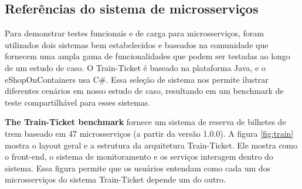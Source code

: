 

\subsection{Referências do sistema de microsserviços}
\label{subsec:benchmark}

Para demonstrar testes funcionais e de carga para microsserviços, foram utilizados dois sistemas bem estabelecidos e baseados na comunidade que fornecem uma ampla gama de funcionalidades que podem ser testadas ao longo de um estudo de caso. O Train-Ticket \cite{trainticket} é baseado na plataforma Java, e o eShopOnContainers \cite{eshop} usa C\#. Essa seleção de sistema nos permite ilustrar diferentes cenários em nosso estudo de caso, resultando em um benchmark de teste compartilhável para esses sistemas.


{\bf The Train-Ticket benchmark} fornece um sistema de reserva de bilhetes de trem baseado em 47 microsserviços (a partir da versão 1.0.0). A figura \ref{fig:train} mostra o layout geral e a estrutura da arquitetura Train-Ticket. Ele mostra como o front-end, o sistema de monitoramento e os serviços interagem dentro do sistema. Essa figura permite que os usuários entendam como cada um dos microsserviços do sistema Train-Ticket depende um do outro.

